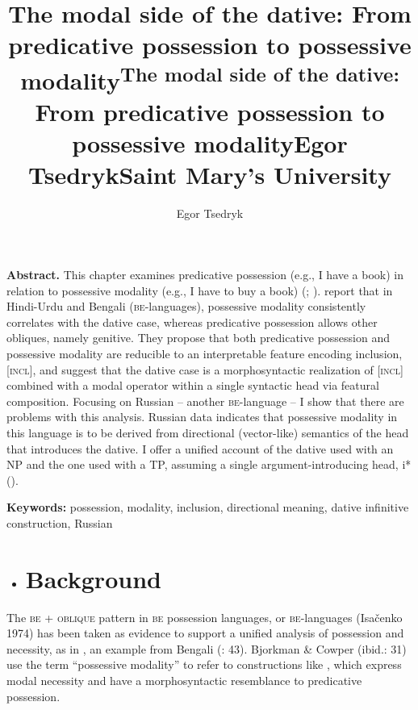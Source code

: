 \documentclass[output=paper,modfonts,nonflat]{langsci/langscibook}
\author{Egor Tsedryk	\affiliation{}}
\title{The modal side of the dative: From predicative possession to possessive modality}
\begin{document}
\maketitle 

\title{\textsuperscript{The modal side of the dative:} From predicative possession to possessive modality}

\title{Egor Tsedryk}

\title{Saint Mary’s University} 

\begin{stylelsAbstract}
\textbf{Abstract.} This chapter examines predicative possession (e.g., I have a book) in relation to possessive modality (e.g., I have to buy a book) (\citealt{Bhatt1997}; \citealt{BjorkmanCowper2016}). \citet{BjorkmanCowper2016} report that in Hindi-Urdu and Bengali (\textsc{be}{}-languages), possessive modality consistently correlates with the dative case, whereas predicative possession allows other obliques, namely genitive. They propose that both predicative possession and possessive modality are reducible to an interpretable feature encoding inclusion, [\textsc{incl}], and suggest that the dative case is a morphosyntactic realization of [\textsc{incl}] combined with a modal operator within a single syntactic head via featural composition. Focusing on Russian – another \textsc{be}{}-language – I show that there are problems with this analysis. Russian data indicates that possessive modality in this language is to be derived from directional (vector-like) semantics of the head that introduces the dative. I offer a unified account of the dative used with an NP and the one used with a TP, assuming a single argument-introducing head, i* (\citealt{WoodMarantz2017}).
\end{stylelsAbstract}

\begin{stylelsAbstract}
\textbf{Keywords:} possession, modality, inclusion, directional meaning, dative infinitive construction, Russian
\end{stylelsAbstract}

\begin{itemize}
\item \section{Background}
\end{itemize}

The \textsc{be} + \textsc{oblique} pattern in \textsc{be} possession languages, or \textsc{be}{}-languages (Isačenko 1974) has been taken as evidence to support a unified analysis of possession and necessity, as in , an example from Bengali (\citealt{BjorkmanCowper2016}: 43). Bjorkman \& Cowper (ibid.: 31) use the term “possessive modality” to refer to constructions like , which express modal necessity and have a morphosyntactic resemblance to predicative possession. 
\end{document}

